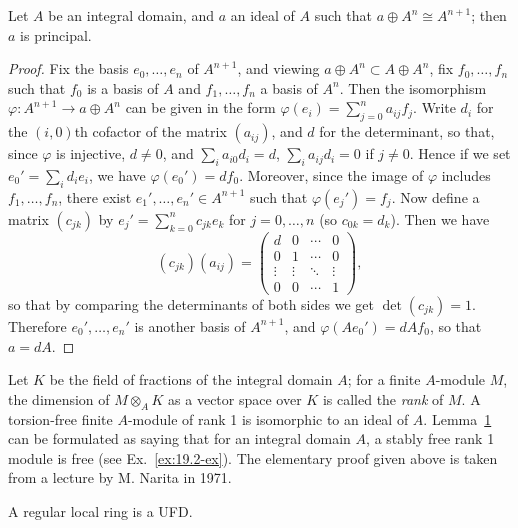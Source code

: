 \begin{lemma}\label{lem:20.1}
Let $A$ be an integral domain, and $a$ an ideal of $A$ such that
$a \oplus A^n \cong A^{n+1}$; then $a$ is principal.
\end{lemma}

\begin{proof}
Fix the basis $e_0, \ldots, e_n$ of $A^{n+1}$, and viewing $a \oplus A^n \subset A \oplus A^n$, fix
$f_0, \ldots, f_n$ such that $f_0$ is a basis of $A$ and $f_1, \ldots, f_n$ a basis of $A^n$. Then
the isomorphism $\varphi\colon A^{n+1} \to a \oplus A^n$ can be given in the form $\varphi(e_i) =
\sum_{j=0}^{n} a_{ij}f_j$. Write $d_i$ for the $(i, 0)$th cofactor of the matrix $(a_{ij})$, and $d$
for the determinant, so that, since $\varphi$ is injective, $d \neq 0$, and $\sum_i a_{i0}d_i = d$,
$\sum_i a_{ij}d_i = 0$ if $j \neq 0$. Hence if we set $e_0' = \sum_i d_ie_i$, we have $\varphi(e_0') = df_0$.
Moreover, since the image of $\varphi$ includes $f_1, \ldots, f_n$, there exist $e_1', \ldots,
e_n' \in A^{n+1}$ such that $\varphi(e_j') = f_j$. Now define a matrix $(c_{jk})$ by $e_j' = \sum_{k=0}^{n} c_{jk}e_k$
for $j = 0, \ldots, n$ (so $c_{0k} = d_k$). Then we have
\[
  (c_{jk})(a_{ij}) = \begin{pmatrix}
    d & 0 & \cdots & 0 \\
    0 & 1 & \cdots & 0 \\
    \vdots & \vdots & \ddots & \vdots \\
    0 & 0 & \cdots & 1
  \end{pmatrix},
\]
so that by comparing the determinants of both sides we get $\det(c_{jk}) = 1$.
Therefore $e_0', \ldots, e_n'$ is another basis of $A^{n+1}$, and $\varphi(Ae_0') = dAf_0$,
so that $a = dA$.
\end{proof}

Let $K$ be the field of fractions of the integral domain $A$; for a finite
$A$-module $M$, the dimension of $M \otimes_A K$ as a vector space over $K$ is called
the \emph{rank} of $M$. A torsion-free finite $A$-module of rank 1 is isomorphic to
an ideal of $A$. Lemma~\hyperref[lem:20.1]{1} can be formulated as saying that for an integral
domain $A$, a stably free rank 1 module is free (see Ex.~\ref{ex:19.2-ex}). The elementary
proof given above is taken from a lecture by M. Narita in 1971.

\begin{theorem}\label{thm:20.3}
A regular local ring is a
UFD.
\end{theorem}

